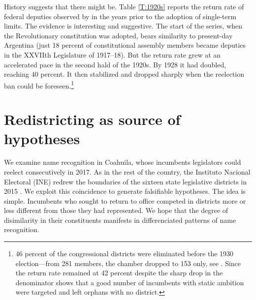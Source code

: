 \documentclass[letter,12pt]{article}
\begin{document}
History suggests that there might be. Table \ref{T:1920s} reports the return rate of federal deputies observed by \citet{godoy.reeleccion.2014} in the years prior to the adoption of single-term limits. The evidence is interesting and suggestive. The start of the series, when the Revolutionary constitution was adopted, bears similarity to present-day Argentina (just 18 percent of constitutional assembly members became deputies in the XXVIIth Legislature of 1917--18). But the return rate grew at an accelerated pace in the second hald of the 1920s. By 1928 it had doubled, reaching 40 percent. It then stabilized and dropped sharply when the reelection ban could be foreseen.\footnote{46 percent of the congressional districts were eliminated before the 1930 election---from 281 members, the chamber dropped to 153 only, see \citet[][:23]{godoy.reeleccion.2014}. Since the return rate remained at 42 percent despite the sharp drop in the denominator shows that a good number of incumbents with static ambition were targeted and left orphans with no district.} 



\section{Redistricting as source of hypotheses}

\noindent We examine name recognition in Coahuila, whose incumbents legislators could reelect consecutively in 2017. As in the rest of the country, the Instituto Nacional Electoral (INE) redrew the boundaries of the sixteen state legislative districts in 2015 \citep{trelles.etalDatosabiertos.pyg.2016}. We exploit this coincidence to generate falsifiable hypotheses. The idea is simple. Incumbents who sought to return to office competed in districts more or less different from those they had represented. We hope that the degree of disimilarity in their constituents manifests in differenciated patterns of name recognition. 
\end{document}
